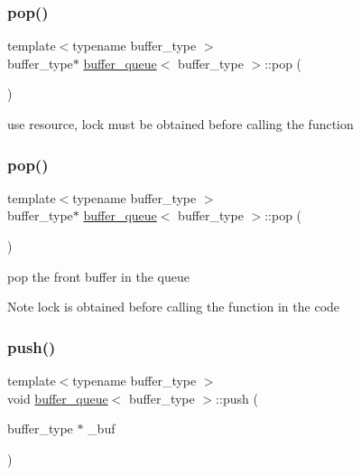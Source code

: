 \subsubsection{\texorpdfstring{pop()}{pop()}\hspace{0.1cm}{\footnotesize\ttfamily [1/2]}}
{\footnotesize\ttfamily template$<$typename buffer\+\_\+type $>$ \\
buffer\+\_\+type$\ast$ \hyperlink{structbuffer__queue}{buffer\+\_\+queue}$<$ buffer\+\_\+type $>$\+::pop (\begin{DoxyParamCaption}{ }\end{DoxyParamCaption})\hspace{0.3cm}{\ttfamily [inline]}}



use resource, lock must be obtained before calling the function 

\mbox{\label{structbuffer__queue_ab26cbb480e9a300a4a021f4be1bb2735}} 
\subsubsection{\texorpdfstring{pop()}{pop()}\hspace{0.1cm}{\footnotesize\ttfamily [2/2]}}
{\footnotesize\ttfamily template$<$typename buffer\+\_\+type $>$ \\
buffer\+\_\+type$\ast$ \hyperlink{structbuffer__queue}{buffer\+\_\+queue}$<$ buffer\+\_\+type $>$\+::pop (\begin{DoxyParamCaption}{ }\end{DoxyParamCaption})\hspace{0.3cm}{\ttfamily [inline]}}



pop the front buffer in the queue 

\begin{DoxyNote}{Note}
lock is obtained before calling the function in the code 
\end{DoxyNote}
\mbox{\label{structbuffer__queue_a13c104db4054ca0cb59b5e0502267d55}} 
\subsubsection{\texorpdfstring{push()}{push()}\hspace{0.1cm}{\footnotesize\ttfamily [1/2]}}
{\footnotesize\ttfamily template$<$typename buffer\+\_\+type $>$ \\
void \hyperlink{structbuffer__queue}{buffer\+\_\+queue}$<$ buffer\+\_\+type $>$\+::push (\begin{DoxyParamCaption}\item[{buffer\+\_\+type $\ast$}]{\+\_\+buf }\end{DoxyParamCaption})\hspace{0.3cm}{\ttfamily [inline]}}



